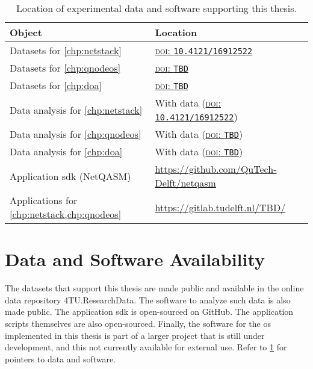 \begin{table}[t]
    \centering
    \begin{tabularx}{\linewidth}{Xl}
        \toprule
        \textbf{Object}                                  & \textbf{Location}                                                                            \\
        \midrule
        Datasets for \cref{chp:netstack}                 & \href{https://doi.org/10.4121/16912522}{\textsc{doi}: \texttt{10.4121/16912522}}             \\
        Datasets for \cref{chp:qnodeos}                  & \href{https://doi.org/xx.xxxx/xxxxxxxx}{\textsc{doi}: \texttt{TBD}}                          \\
        Datasets for \cref{chp:doa}                      & \href{https://doi.org/yy.yyyy/yyyyyyyy}{\textsc{doi}: \texttt{TBD}}                          \\
        Data analysis for \cref{chp:netstack}            & With data (\href{https://doi.org/10.4121/16912522}{\textsc{doi}: \texttt{10.4121/16912522}}) \\
        Data analysis for \cref{chp:qnodeos}             & With data (\href{https://doi.org/xx.xxxx/xxxxxxxx}{\textsc{doi}: \texttt{TBD}})              \\
        Data analysis for \cref{chp:doa}                 & With data (\href{https://doi.org/yy.yyyy/yyyyyyyy}{\textsc{doi}: \texttt{TBD}})              \\
        Application \acrshort{sdk} (NetQASM)             & \url{https://github.com/QuTech-Delft/netqasm}                                                \\
        Applications for \cref{chp:netstack,chp:qnodeos} & \url{https://gitlab.tudelft.nl/TBD/}                                                         \\
        \bottomrule
    \end{tabularx}
    \caption{
        Location of experimental data and software supporting this thesis.
    }
    \label{tab:data-and-soft}
\end{table}

\section{Data and Software Availability}

The datasets that support this thesis are made public and available in the online data repository
4TU.ResearchData. The software to analyze such data is also made public. The application
\acrfull{sdk} is open-sourced on GitHub. The application scripts themselves are also open-sourced.
Finally, the software for the \acrlong{os} implemented in this thesis is part of a larger project
that is still under development, and this not currently available for external use. Refer to
\cref{tab:data-and-soft} for pointers to data and software.

